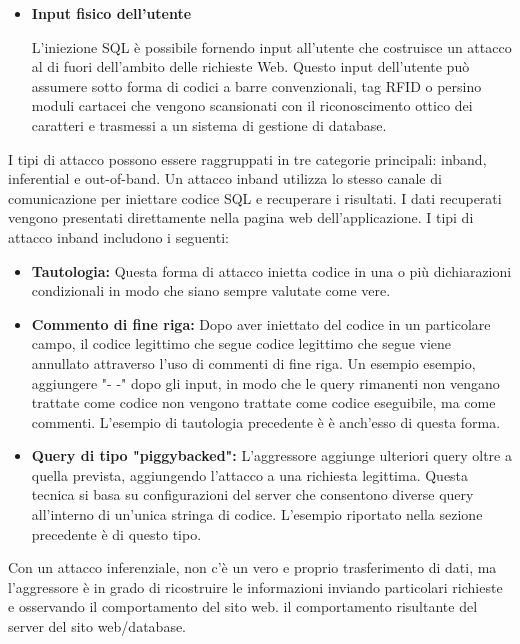 \begin{itemize}
    \item \textbf{Input fisico dell'utente}
    
    L'iniezione SQL è possibile fornendo input all'utente che costruisce un attacco al di fuori dell'ambito delle richieste Web. Questo input dell'utente può assumere sotto forma di codici a barre convenzionali, tag RFID o persino moduli cartacei che vengono scansionati con il riconoscimento ottico dei caratteri e trasmessi a un sistema di gestione di database.
\end{itemize}
I tipi di attacco possono essere raggruppati in tre categorie principali: inband, inferential e out-of-band. Un attacco inband utilizza lo stesso canale di comunicazione per iniettare codice SQL e recuperare i risultati. I dati recuperati vengono presentati direttamente nella pagina web dell'applicazione. I tipi di attacco inband includono i seguenti:
\begin{itemize}
    \item \textbf{Tautologia:} Questa forma di attacco inietta codice in una o più dichiarazioni condizionali in modo che siano sempre valutate come vere. 
    
    \item \textbf{Commento di fine riga:} Dopo aver iniettato del codice in un particolare campo, il codice legittimo che segue codice legittimo che segue viene annullato attraverso l'uso di commenti di fine riga. Un esempio esempio, aggiungere "- -" dopo gli input, in modo che le query rimanenti non vengano trattate come codice non vengono trattate come codice eseguibile, ma come commenti. L'esempio di tautologia precedente è è anch'esso di questa forma.
    
    \item \textbf{Query di tipo "piggybacked":} L'aggressore aggiunge ulteriori query oltre a quella prevista, aggiungendo l'attacco a una richiesta legittima. Questa tecnica si basa su configurazioni del server che consentono diverse query all'interno di un'unica stringa di codice. L'esempio riportato nella sezione precedente è di questo tipo.
\end{itemize}
Con un attacco inferenziale, non c'è un vero e proprio trasferimento di dati, ma l'aggressore è in grado di ricostruire le informazioni inviando particolari richieste e osservando il comportamento del sito web.
il comportamento risultante del server del sito web/database. 

\singlespacing

